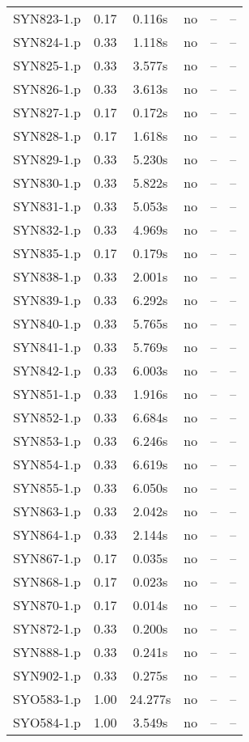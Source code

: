 \begin{center}
\begin{longtable}{||c | c | c | c | c | c||}
SYN823-1.p & 0.17 & 0.116s & no & -- & -- \\
SYN824-1.p & 0.33 & 1.118s & no & -- & -- \\
SYN825-1.p & 0.33 & 3.577s & no & -- & -- \\
SYN826-1.p & 0.33 & 3.613s & no & -- & -- \\
SYN827-1.p & 0.17 & 0.172s & no & -- & -- \\
SYN828-1.p & 0.17 & 1.618s & no & -- & -- \\
SYN829-1.p & 0.33 & 5.230s & no & -- & -- \\
SYN830-1.p & 0.33 & 5.822s & no & -- & -- \\
SYN831-1.p & 0.33 & 5.053s & no & -- & -- \\
SYN832-1.p & 0.33 & 4.969s & no & -- & -- \\
SYN835-1.p & 0.17 & 0.179s & no & -- & -- \\
SYN838-1.p & 0.33 & 2.001s & no & -- & -- \\
SYN839-1.p & 0.33 & 6.292s & no & -- & -- \\
SYN840-1.p & 0.33 & 5.765s & no & -- & -- \\
SYN841-1.p & 0.33 & 5.769s & no & -- & -- \\
SYN842-1.p & 0.33 & 6.003s & no & -- & -- \\
SYN851-1.p & 0.33 & 1.916s & no & -- & -- \\
SYN852-1.p & 0.33 & 6.684s & no & -- & -- \\
SYN853-1.p & 0.33 & 6.246s & no & -- & -- \\
SYN854-1.p & 0.33 & 6.619s & no & -- & -- \\
SYN855-1.p & 0.33 & 6.050s & no & -- & -- \\
SYN863-1.p & 0.33 & 2.042s & no & -- & -- \\
SYN864-1.p & 0.33 & 2.144s & no & -- & -- \\
SYN867-1.p & 0.17 & 0.035s & no & -- & -- \\
SYN868-1.p & 0.17 & 0.023s & no & -- & -- \\
SYN870-1.p & 0.17 & 0.014s & no & -- & -- \\
SYN872-1.p & 0.33 & 0.200s & no & -- & -- \\
SYN888-1.p & 0.33 & 0.241s & no & -- & -- \\
SYN902-1.p & 0.33 & 0.275s & no & -- & -- \\
SYO583-1.p & 1.00 & 24.277s & no & -- & -- \\
SYO584-1.p & 1.00 & 3.549s & no & -- & -- \\

\end{longtable}
\end{center}

